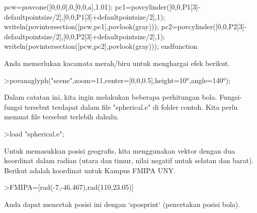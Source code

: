 \documentclass[12pt,arial,letterpaper]{book}
\begin{document}
\begin{eulercomment}
\begin{eulercomment}
\begin{eulercomment}
\begin{eulercomment}
\begin{eulercomment}
\begin{eulercomment}
\begin{eulercomment}
\begin{eulercomment}
\begin{eulercomment}
\begin{eulercomment}
\begin{eulercomment}
\begin{eulercomment}
\begin{eulercomment}
\begin{eulercomment}
\begin{eulercomment}
\begin{eulercomment}
\begin{eulercomment}
\begin{eulercomment}
\begin{eulercomment}
\begin{eulercomment}
\begin{eulercomment}
\begin{eulercomment}
\begin{eulercomment}
\begin{eulercomment}
\begin{eulercomment}
\begin{eulercomment}
\begin{eulercomment}
\begin{eulercomment}
\begin{eulercomment}
\begin{eulercomment}
\begin{eulerudf}
  pcw=povcone([0,0,0],0,[0,0,a],1.01);
  pc1=povcylinder([0,0,P1[3]-defaultpointsize/2],[0,0,P1[3]+defaultpointsize/2],1);
  writeln(povintersection([pcw,pc1],povlook(gray)));
  pc2=povcylinder([0,0,P2[3]-defaultpointsize/2],[0,0,P2[3]+defaultpointsize/2],1);
  writeln(povintersection([pcw,pc2],povlook(gray)));
  endfunction
\end{eulerudf}
\begin{eulercomment}
Anda memerlukan kacamata merah/biru untuk menghargai efek berikut.
\end{eulercomment}
\begin{eulerprompt}
>povanaglyph("scene",zoom=11,center=[0,0,0.5],height=10°,angle=140°);
\end{eulerprompt}
\begin{eulercomment}
Dalam catatan ini, kita ingin melakukan beberapa perhitungan bola.
Fungsi-fungsi tersebut terdapat dalam file "spherical.e" di folder
contoh. Kita perlu memuat file tersebut terlebih dahulu.
\end{eulercomment}
\begin{eulerprompt}
>load "spherical.e";
\end{eulerprompt}
\begin{eulercomment}
Untuk memasukkan posisi geografis, kita menggunakan vektor dengan dua
koordinat dalam radian (utara dan timur, nilai negatif untuk selatan
dan barat). Berikut adalah koordinat untuk Kampus FMIPA UNY.
\end{eulercomment}
\begin{eulerprompt}
>FMIPA=[rad(-7,-46.467),rad(110,23.05)]
\end{eulerprompt}
\begin{euleroutput}
  [-0.13569,  1.92657]
\end{euleroutput}
\begin{eulercomment}
Anda dapat mencetak posisi ini dengan `sposprint` (pencetakan posisi
bola).
\end{eulercomment}

\end{eulercomment}
\end{eulercomment}
\end{eulercomment}
\end{eulercomment}
\end{eulercomment}
\end{eulercomment}
\end{eulercomment}
\end{eulercomment}
\end{eulercomment}
\end{eulercomment}
\end{eulercomment}
\end{eulercomment}
\end{eulercomment}
\end{eulercomment}
\end{eulercomment}
\end{eulercomment}
\end{eulercomment}
\end{eulercomment}
\end{eulercomment}
\end{eulercomment}
\end{eulercomment}
\end{eulercomment}
\end{eulercomment}
\end{eulercomment}
\end{eulercomment}
\end{eulercomment}
\end{eulercomment}
\end{eulercomment}
\end{eulercomment}
\end{eulercomment}
\end{document}
